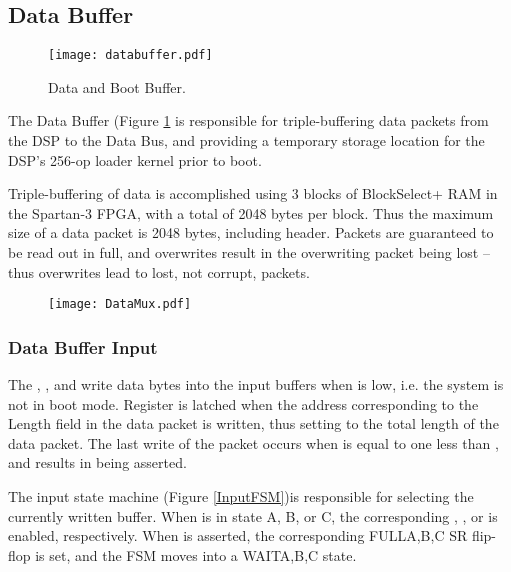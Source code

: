 
\subsection{Data Buffer}

\begin{figure}[h]
  \texttt{[image: databuffer.pdf]}
  \caption{Data and Boot Buffer.}
  \label{databuffer}
\end{figure}

The Data Buffer (Figure \ref{databuffer} is responsible for
triple-buffering data packets from the DSP to the Data Bus, and
providing a temporary storage location for the DSP's 256-op loader
kernel prior to boot.
    
Triple-buffering of data is accomplished using 3 blocks of
BlockSelect+ RAM in the Spartan-3 FPGA, with a total of 2048 bytes per
block. Thus the maximum size of a data packet is 2048 bytes, including
header. Packets are guaranteed to be read out in full, and overwrites
result in the overwriting packet being lost -- thus overwrites lead to
lost, not corrupt, packets.



\begin{figure}
  \texttt{[image: DataMux.pdf]}
\end{figure}
        
\subsubsection{Data Buffer Input}
        
      
The , , and  write
data bytes into the input buffers when  is low, i.e. the
system is not in boot mode. Register  is latched
when the address corresponding to the Length field in the data packet
is written, thus setting  to the total length of
the data packet. The last write of the packet occurs when
 is equal to one less than ,
and results in  being asserted.

The input state machine  (Figure \ref{InputFSM})is responsible for selecting the
currently written buffer. When  is in state A, B, or C,
the corresponding , , or 
is enabled, respectively. When  is asserted, the
corresponding FULL{A,B,C} SR flip-flop is set, and the FSM moves into
a WAIT{A,B,C} state.

